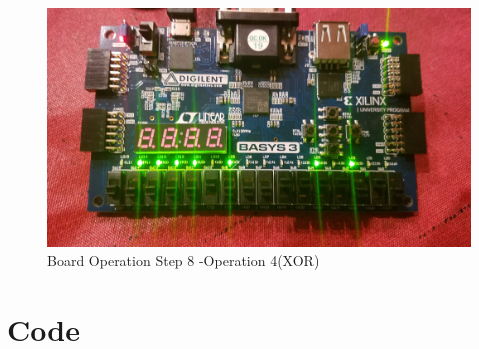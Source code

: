 \documentclass[11pt]{article}
\newcommand{\Verilog}[2][]{%
	
}
\begin{document}
\begin{figure}[ht]\centering
	\includegraphics[width=1.0\textwidth,trim=0 0mm 0 0,clip]{Op4}
	\caption{Board Operation Step 8 -Operation 4(XOR)}
\end{figure}


	\clearpage

\section*{Code}

\Verilog[firstline=23, lastline=43,caption=Verilog Register Source,label=code:file_ex]
{register.sv}

\Verilog[firstline=23, lastline=48,caption=Verilog ALU Source,label=code:file_ex]
{alu.sv}

\Verilog[firstline=23, lastline=35,caption=Verilog Top Lab 9 Source,label=code:file_ex]
{top_lab9.sv}

\Verilog[firstline=23, lastline=48,caption=Verilog register Test Bench,label=code:file_ex]
{register_test.sv}

\clearpage

\Verilog[firstline=23, lastline=43,caption=Verilog ALU Test Bench,label=code:file_ex]
{alu_test.sv}
\end{document}
